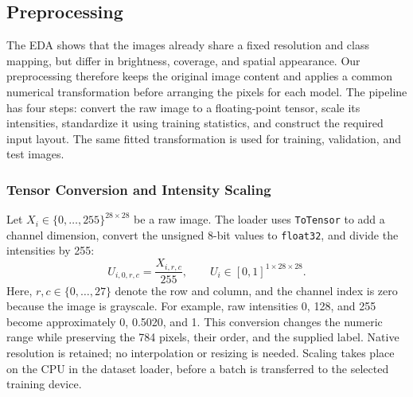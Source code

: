 \subsection{Preprocessing}
\label{sec:preprocessing}
The EDA shows that the images already share a fixed resolution and class
mapping, but differ in brightness, coverage, and spatial appearance. Our
preprocessing therefore keeps the original image content and applies a common
numerical transformation before arranging the pixels for each model. The
pipeline has four steps: convert the raw image to a floating-point tensor,
scale its intensities, standardize it using training statistics, and construct
the required input layout. The same fitted transformation is used for
training, validation, and test images.

\subsubsection{Tensor Conversion and Intensity Scaling}
Let \(X_i\in\{0,\ldots,255\}^{28\times28}\) be a raw image. The loader
uses \texttt{ToTensor} to add a channel dimension, convert the unsigned
8-bit values to \texttt{float32}, and divide the intensities by 255:
\begin{equation}
 U_{i,0,r,c}=\frac{X_{i,r,c}}{255},\qquad
 U_i\in[0,1]^{1\times28\times28}.
 \label{eq:scaling}
\end{equation}
Here, \(r,c\in\{0,\ldots,27\}\) denote the row and column, and the
channel index is zero because the image is grayscale. For example, raw
intensities 0, 128, and 255 become approximately 0, 0.5020, and 1.
This conversion changes the numeric range while preserving the 784 pixels,
their order, and the supplied label. Native resolution is retained; no
interpolation or resizing is needed. Scaling takes place on the CPU in the
dataset loader, before a batch is transferred to the selected training device.

